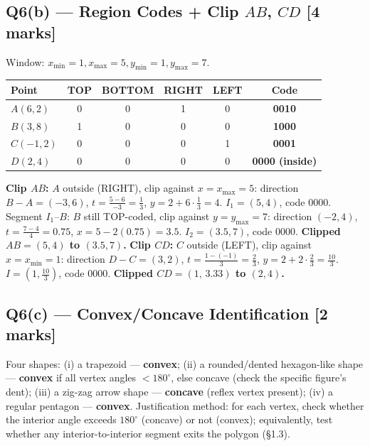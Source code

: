 \documentclass[12pt, a4paper]{article}
\newenvironment{solutionbox}{\begin{mdframed}[style=solutionframe]}{\end{mdframed}}
\newenvironment{answerbox}{\begin{mdframed}[style=answerframe]}{\end{mdframed}}
\begin{document}
\subsection*{Q6(b) --- Region Codes + Clip $AB$, $CD$ [4 marks]}
\begin{solutionbox}
Window: $x_{\min}=1,x_{\max}=5,y_{\min}=1,y_{\max}=7$.
\begin{center}
\begin{tabular}{lccccc}
\toprule
Point & TOP & BOTTOM & RIGHT & LEFT & Code \\
\midrule
$A(6,2)$ & 0 & 0 & 1 & 0 & \textbf{0010} \\
$B(3,8)$ & 1 & 0 & 0 & 0 & \textbf{1000} \\
$C(-1,2)$ & 0 & 0 & 0 & 1 & \textbf{0001} \\
$D(2,4)$ & 0 & 0 & 0 & 0 & \textbf{0000 (inside)} \\
\bottomrule
\end{tabular}
\end{center}
\textbf{Clip $AB$:} $A$ outside (RIGHT), clip against $x=x_{\max}=5$: direction $B-A=(-3,6)$, $t=\frac{5-6}{-3}=\frac13$, $y=2+6\cdot\frac13=4$. $I_1=(5,4)$, code $0000$. Segment $I_1$--$B$: $B$ still TOP-coded, clip against $y=y_{\max}=7$: direction $(-2,4)$, $t=\frac{7-4}{4}=0.75$, $x=5-2(0.75)=3.5$. $I_2=(3.5,7)$, code $0000$. \textbf{Clipped $AB=(5,4)$ to $(3.5,7)$.}
\textbf{Clip $CD$:} $C$ outside (LEFT), clip against $x=x_{\min}=1$: direction $D-C=(3,2)$, $t=\frac{1-(-1)}{3}=\frac23$, $y=2+2\cdot\frac23=\frac{10}{3}$. $I=(1,\tfrac{10}{3})$, code $0000$. \textbf{Clipped $CD=(1,\,3.33)$ to $(2,4)$.}
\end{solutionbox}

\subsection*{Q6(c) --- Convex/Concave Identification [2 marks]}
\begin{answerbox}
Four shapes: (i) a trapezoid --- \textbf{convex}; (ii) a rounded/dented hexagon-like shape --- \textbf{convex} if all vertex angles $<180^\circ$, else concave (check the specific figure's dent); (iii) a zig-zag arrow shape --- \textbf{concave} (reflex vertex present); (iv) a regular pentagon --- \textbf{convex}. Justification method: for each vertex, check whether the interior angle exceeds $180^\circ$ (concave) or not (convex); equivalently, test whether any interior-to-interior segment exits the polygon (\S1.3).
\end{answerbox}
\end{document}
